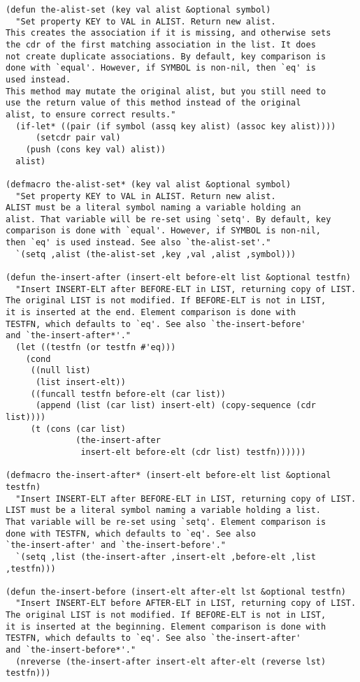 \documentclass[11pt]{article}
\begin{document}
\begin{verbatim}
(defun the-alist-set (key val alist &optional symbol)
  "Set property KEY to VAL in ALIST. Return new alist.
This creates the association if it is missing, and otherwise sets
the cdr of the first matching association in the list. It does
not create duplicate associations. By default, key comparison is
done with `equal'. However, if SYMBOL is non-nil, then `eq' is
used instead.
This method may mutate the original alist, but you still need to
use the return value of this method instead of the original
alist, to ensure correct results."
  (if-let* ((pair (if symbol (assq key alist) (assoc key alist))))
      (setcdr pair val)
    (push (cons key val) alist))
  alist)

(defmacro the-alist-set* (key val alist &optional symbol)
  "Set property KEY to VAL in ALIST. Return new alist.
ALIST must be a literal symbol naming a variable holding an
alist. That variable will be re-set using `setq'. By default, key
comparison is done with `equal'. However, if SYMBOL is non-nil,
then `eq' is used instead. See also `the-alist-set'."
  `(setq ,alist (the-alist-set ,key ,val ,alist ,symbol)))

(defun the-insert-after (insert-elt before-elt list &optional testfn)
  "Insert INSERT-ELT after BEFORE-ELT in LIST, returning copy of LIST.
The original LIST is not modified. If BEFORE-ELT is not in LIST,
it is inserted at the end. Element comparison is done with
TESTFN, which defaults to `eq'. See also `the-insert-before'
and `the-insert-after*'."
  (let ((testfn (or testfn #'eq)))
    (cond
     ((null list)
      (list insert-elt))
     ((funcall testfn before-elt (car list))
      (append (list (car list) insert-elt) (copy-sequence (cdr list))))
     (t (cons (car list)
              (the-insert-after
               insert-elt before-elt (cdr list) testfn))))))

(defmacro the-insert-after* (insert-elt before-elt list &optional testfn)
  "Insert INSERT-ELT after BEFORE-ELT in LIST, returning copy of LIST.
LIST must be a literal symbol naming a variable holding a list.
That variable will be re-set using `setq'. Element comparison is
done with TESTFN, which defaults to `eq'. See also
`the-insert-after' and `the-insert-before'."
  `(setq ,list (the-insert-after ,insert-elt ,before-elt ,list ,testfn)))

(defun the-insert-before (insert-elt after-elt lst &optional testfn)
  "Insert INSERT-ELT before AFTER-ELT in LIST, returning copy of LIST.
The original LIST is not modified. If BEFORE-ELT is not in LIST,
it is inserted at the beginning. Element comparison is done with
TESTFN, which defaults to `eq'. See also `the-insert-after'
and `the-insert-before*'."
  (nreverse (the-insert-after insert-elt after-elt (reverse lst) testfn)))


\end{verbatim}
\end{document}
